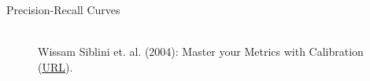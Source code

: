 \begin{vbframe}{Precision-Recall Curves}


\begin{figure}
  \centering
  \tiny
  \\ Wissam Siblini et. al. (2004): Master your Metrics with Calibration
  (\href{https://arxiv.org/pdf/1909.02827.pdf}{\underline{URL}}).
\end{figure}

%

\end{vbframe}

